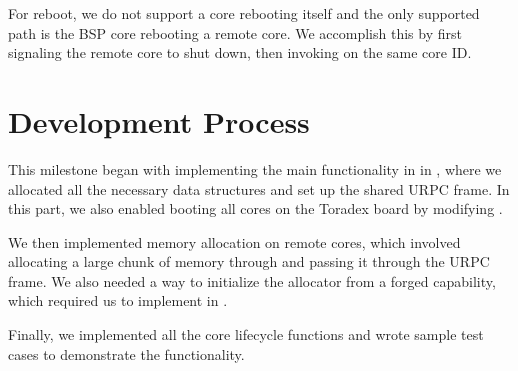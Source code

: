 \medskip\noindent
For reboot, we do not support a core rebooting itself and the only supported path is the BSP core
rebooting a remote core. We accomplish this by first signaling the remote core to shut down, then
invoking  on the same core ID.

\section{Development Process}

This milestone began with implementing the main functionality in  in
, where we allocated all the necessary data structures and set up the
shared URPC frame. In this part, we also enabled booting all cores on the Toradex board by
modifying .

\medskip\noindent
We then implemented memory allocation on remote cores, which involved allocating a large chunk of
memory through  and passing it through the URPC frame. We also needed a way to
initialize the allocator from a forged capability, which required us to implement
 in .

\medskip\noindent
Finally, we implemented all the core lifecycle functions and wrote sample test cases to demonstrate
the functionality.